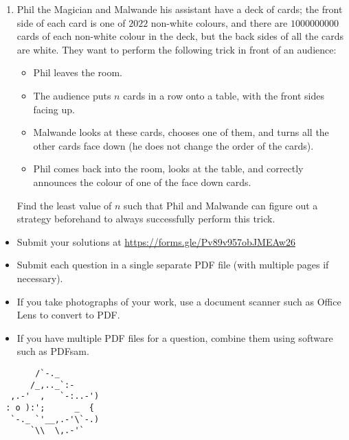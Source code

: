 \documentclass{article}
\begin{document}
\begin{enumerate}[itemsep=\fill]
\item %
Phil the Magician and Malwande his assistant have a deck of cards; the front side of each card is one of $2022$ non-white colours, and there are $1000000000$ cards of each non-white colour in the deck, but the back sides of all the cards are white.
They want to perform the following trick in front of an audience:
\begin{itemize}
  \item Phil leaves the room.
  \item The audience puts $n$ cards in a row onto a table, with the front sides facing up.
  \item Malwande looks at these cards, chooses one of them, and turns all the other cards face down (he does not change the order of the cards).
  \item Phil comes back into the room, looks at the table, and correctly announces the colour of one of the face down cards.
\end{itemize}
Find the least value of $n$ such that Phil and Malwande can figure out a strategy beforehand to always successfully perform this trick.

\end{enumerate}


\vfill
\small
\begin{itemize}
	\item Submit your solutions at \href{https://forms.gle/Pv89v957obJMEAw26}{https://forms.gle/Pv89v957obJMEAw26}
	\item Submit each question in a single separate PDF file (with multiple pages if necessary).
	\item If you take photographs of your work, use a document scanner such as Office Lens to convert to PDF.
	\item If you have multiple PDF files for a question, combine them using software such as PDFsam.
\end{itemize}

\vfill
\centering
\small
\begin{BVerbatim}
       /`-._
      /_,.._`:-         
  ,.-'  ,   `-:..-')   
 : o ):';      _  {   
  `-._ `'__,.-'\`-.)
      `\\  \,.-'`
\end{BVerbatim}
\end{document}
